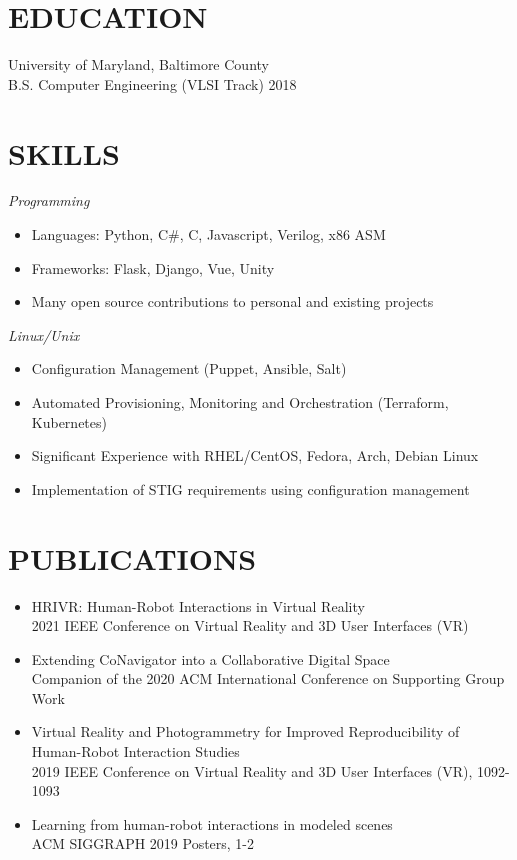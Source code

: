 \documentclass[line]{resume}
\begin{document}
\address{437 Sudbury Road, Linthicum, MD 21090}
\address{(240) 547-9517, mark@hackafe.net}

\begin{resume}
\section{EDUCATION}
University of Maryland, Baltimore County\\
B.S. Computer Engineering (VLSI Track) 2018

\section{SKILLS} {\sl Programming}
                \begin{itemize}
                \item Languages: Python, C\#, C, Javascript, Verilog, x86 ASM
                \item Frameworks: Flask, Django, Vue, Unity
                \item Many open source contributions to personal and existing projects
                \end{itemize}
                {\sl Linux/Unix}
                \begin{itemize}
                \item Configuration Management (Puppet, Ansible, Salt)
                \item Automated Provisioning, Monitoring and Orchestration (Terraform, Kubernetes)
                \item Significant Experience with RHEL/CentOS, Fedora, Arch, Debian Linux
                \item Implementation of STIG requirements using configuration management
                \end{itemize}
 
\section {PUBLICATIONS}
  \begin{itemize}
      \item HRIVR: Human-Robot Interactions in Virtual Reality \\
        2021 IEEE Conference on Virtual Reality and 3D User Interfaces (VR)
      \item Extending CoNavigator into a Collaborative Digital Space \\
        Companion of the 2020 ACM International Conference on Supporting Group Work
      \item Virtual Reality and Photogrammetry for Improved Reproducibility of Human-Robot Interaction Studies \\
        2019 IEEE Conference on Virtual Reality and 3D User Interfaces (VR), 1092-1093
      \item Learning from human-robot interactions in modeled scenes \\
        ACM SIGGRAPH 2019 Posters, 1-2
  \end{itemize}
 

\end{resume}
\end{document}
